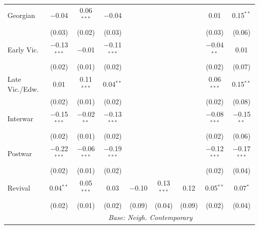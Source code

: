 \documentclass[]{article}
\begin{document}
\begin{table}[!htbp]
\begin{tabular}{@{\extracolsep{5pt}}lcccccccc}
  Georgian & $-$0.04 & 0.06$^{***}$ & $-$0.04 &  &  &  & 0.01 & 0.15$^{**}$ \\ 
  & (0.03) & (0.02) & (0.03) &  &  &  & (0.03) & (0.06) \\ 
  Early Vic. & $-$0.13$^{***}$ & $-$0.01 & $-$0.11$^{***}$ &  &  &  & $-$0.04$^{**}$ & 0.01 \\ 
  & (0.02) & (0.01) & (0.02) &  &  &  & (0.02) & (0.07) \\ 
  Late Vic./Edw. & 0.01 & 0.11$^{***}$ & 0.04$^{**}$ &  &  &  & 0.06$^{***}$ & 0.15$^{**}$ \\ 
  & (0.02) & (0.01) & (0.02) &  &  &  & (0.02) & (0.08) \\ 
  Interwar & $-$0.15$^{***}$ & $-$0.02$^{**}$ & $-$0.13$^{***}$ &  &  &  & $-$0.08$^{***}$ & $-$0.15$^{**}$ \\ 
  & (0.02) & (0.01) & (0.02) &  &  &  & (0.02) & (0.06) \\ 
  Postwar & $-$0.22$^{***}$ & $-$0.06$^{***}$ & $-$0.19$^{***}$ &  &  &  & $-$0.12$^{***}$ & $-$0.17$^{***}$ \\ 
  & (0.02) & (0.01) & (0.02) &  &  &  & (0.02) & (0.04) \\ 
  Revival & 0.04$^{**}$ & 0.05$^{***}$ & 0.03 & $-$0.10 & 0.13$^{***}$ & 0.12 & 0.05$^{**}$ & 0.07$^{*}$ \\ 
  & (0.02) & (0.01) & (0.02) & (0.09) & (0.04) &  (0.09) & (0.02) & (0.04) \\ 
    \cmidrule{2-9}
  & \multicolumn{8}{c}{\emph{Base: Neigh. Contemporary}} \\


\end{tabular}
\end{table}
\end{document}
